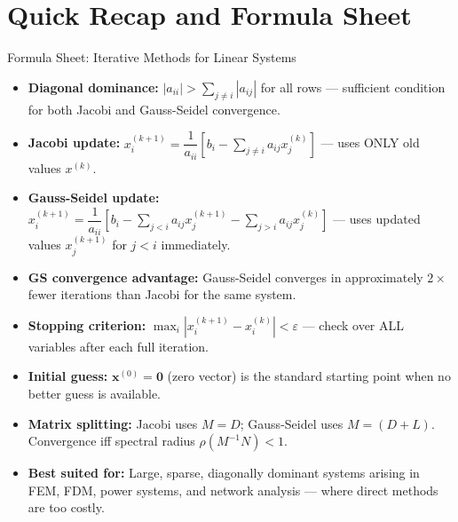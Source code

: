 \documentclass[12pt,a4paper]{article}
\begin{document}
\section{Quick Recap and Formula Sheet}

\begin{learnbox}{Formula Sheet: Iterative Methods for Linear Systems}
\begin{itemize}
  \item \textbf{Diagonal dominance:} \(|a_{ii}| > \displaystyle\sum_{j\neq i}|a_{ij}|\)
        for all rows --- sufficient condition for both Jacobi and Gauss-Seidel convergence.
  \item \textbf{Jacobi update:} \(x_i^{(k+1)} = \dfrac{1}{a_{ii}}\!\left[b_i -
        \displaystyle\sum_{j\neq i}a_{ij}x_j^{(k)}\right]\) --- uses ONLY old values \(x^{(k)}\).
  \item \textbf{Gauss-Seidel update:} \(x_i^{(k+1)} = \dfrac{1}{a_{ii}}\!\left[b_i
        - \displaystyle\sum_{j<i}a_{ij}x_j^{(k+1)} - \displaystyle\sum_{j>i}a_{ij}x_j^{(k)}
        \right]\) --- uses updated values \(x_j^{(k+1)}\) for \(j < i\) immediately.
  \item \textbf{GS convergence advantage:} Gauss-Seidel converges in approximately \(2\times\)
        fewer iterations than Jacobi for the same system.
  \item \textbf{Stopping criterion:} \(\max_i\left|x_i^{(k+1)} - x_i^{(k)}\right| < \varepsilon\)
        --- check over ALL variables after each full iteration.
  \item \textbf{Initial guess:} \(\mathbf{x}^{(0)} = \mathbf{0}\) (zero vector) is the
        standard starting point when no better guess is available.
  \item \textbf{Matrix splitting:} Jacobi uses \(M=D\); Gauss-Seidel uses \(M=(D+L)\).
        Convergence iff spectral radius \(\rho(M^{-1}N) < 1\).
  \item \textbf{Best suited for:} Large, sparse, diagonally dominant systems arising in
        FEM, FDM, power systems, and network analysis --- where direct methods are too costly.
\end{itemize}
\end{learnbox}
\end{document}

